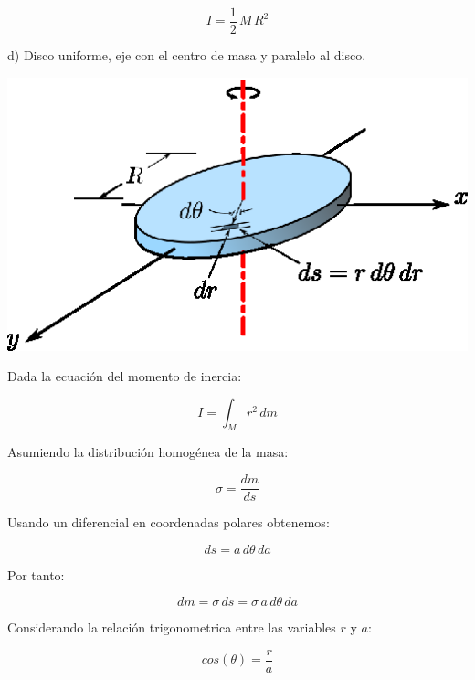 \documentclass[letter,11pt]{article}
\begin{document}
\begin{equation}
    I = \frac{1}{2}\, M\, R^2
\end{equation}

\newpage
d) Disco uniforme, eje con el centro de masa y paralelo al disco.

\begin{center}
\includegraphics[scale=1.10]{resources/f4.eps}
\end{center}

Dada la ecuación del momento de inercia:

\begin{equation}
    I = \int_{M} r^2\, dm
\label{momentodeinercia4}
\end{equation}

Asumiendo la distribución homogénea de la masa:

\begin{equation*}
    \sigma = \frac{dm}{ds}
\end{equation*}

Usando un diferencial en coordenadas polares obtenemos:

\begin{equation*}
    ds = a\, d\theta\, da
\end{equation*}

Por tanto:

\begin{equation}
    dm = \sigma\, ds = \sigma\, a\, d\theta\, da
\label{dm4}
\end{equation}

Considerando la relación trigonometrica entre las variables $r$ y $a$:

\begin{equation*}
    cos (\theta) = \frac{r}{a}
\end{equation*}
\end{document}
